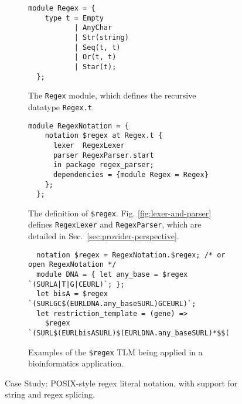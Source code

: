 \documentclass[acmsmall]{acmart}
\newcommand{\li}[1]{\lstinline[basicstyle=\ttfamily\fontsize{9pt}{1em}\selectfont]{#1}}
\begin{document}
\begin{figure}[t]
\begin{subfigure}[t]{0.45\textwidth}
\vspace{-4px}
\begin{lstlisting}[mathescape=~]
  module Regex = {
    type t = Empty
           | AnyChar 
           | Str(string)
           | Seq(t, t) 
           | Or(t, t) 
           | Star(t);
  };
\end{lstlisting}
\vspace{-5px}
\caption{The \li{Regex} module, which defines the recursive datatype \li{Regex.t}.}
\label{fig:Regex-module-def}
\end{subfigure}
\hfill
\begin{subfigure}[t]{0.53\textwidth}
\vspace{-4px}
\begin{lstlisting}[mathescape=|]
  module RegexNotation = {
    notation $regex at Regex.t {
      lexer  RegexLexer
      parser RegexParser.start
      in package regex_parser;
      dependencies = {module Regex = Regex}
    };
  };
\end{lstlisting}
\vspace{-5px}
\caption{The definition of \li{$regex}. Fig. \ref{fig:lexer-and-parser} defines \li{RegexLexer} and \li{RegexParser}, which are detailed in Sec.~\ref{sec:provider-perspective}.}
\label{fig:regex-tlm-def}
\end{subfigure}

\begin{subfigure}[t]{\textwidth}
\vspace{7px}
\begin{lstlisting}
  notation $regex = RegexNotation.$regex; /* or open RegexNotation */
  module DNA = { let any_base = $regex `(SURLA|T|G|CEURL)`; };
  let bisA = $regex `(SURLGC$(EURLDNA.any_baseSURL)GCEURL)`;
  let restriction_template = (gene) => 
    $regex `(SURL$(EURLbisASURL)$(EURLDNA.any_baseSURL)*$$(EURLgeneSURL)$(EURLDNA.any_baseSURL)*$(EURLbisASURL)EURL)`;
\end{lstlisting}
\vspace{-4px}
\caption{Examples of the \li{$regex} TLM being applied in a bioinformatics application. %
}
\label{fig:first-tlm-example}
\end{subfigure}
\vspace{1px}
\caption{Case Study: POSIX-style regex literal notation, with support for string and regex splicing.}
\label{fig:regex-case-study}
\end{figure}
\end{document}
